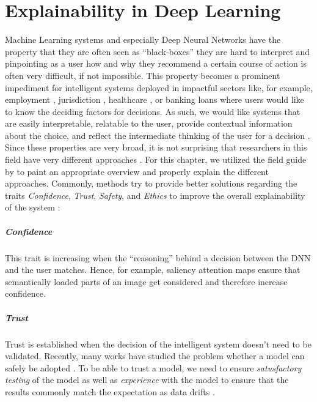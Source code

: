 \newcommand{\lime}{\textsc{LIME}}

\chapter{Explainability in Deep Learning} 
\label{sec:Explainability} 

Machine Learning systems and especially Deep Neural Networks have the property that they are often seen as ``black-boxes'' \ie they are hard to interpret and pinpointing as a user how and why they recommend a certain course of action is often very difficult, if not impossible. This property becomes a prominent impediment for intelligent systems deployed in impactful sectors like, for example, employment \citep{QinZXZJCX18, CaiSJLQXZ20, ZhaoHCFZ18}, jurisdiction \citep{GuoHQX019}, healthcare \citep{Pasa2019}, or banking loans where users would like to know the deciding factors for decisions. As such, we would like systems that are easily interpretable, relatable to the user, provide contextual information about the choice, and reflect the intermediate thinking of the user for a decision \citep{xie2020explainable}. Since these properties are very broad, it is not surprising that researchers in this field have very different approaches \citep{xie2020explainable}. For this chapter, we utilized the field guide by \citet{xie2020explainable} to paint an appropriate overview and properly explain the different approaches. Commonly, methods try to provide better solutions regarding the traits \emph{Confidence}, \emph{Trust}, \emph{Safety}, and \emph{Ethics} to improve the overall explainability of the system \citep{xie2020explainable}:

\paragraph{Confidence}
This trait is increasing when the ``reasoning'' behind a decision between the DNN and the user matches. Hence, for example, saliency attention maps \citep{ParkHARSDR18, HudsonM18} ensure that semantically loaded parts of an image get considered and therefore increase confidence.

\paragraph{Trust} 
Trust is established when the decision of the intelligent system doesn't need to be validated. Recently, many works have studied the problem whether a model can safely be adopted \citep{GharibLBADB18, VarshneyA17, JiangKGG18}. To be able to trust a model, we need to ensure \emph{satusfactory testing} of the model as well as \emph{experience} with the model to ensure that the results commonly match the expectation as data drifts \citep{xie2020explainable}.

